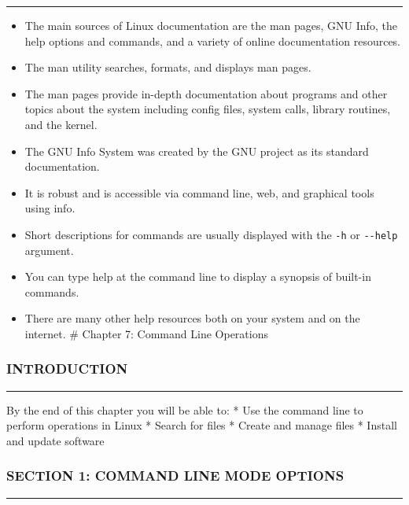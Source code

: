 \begin{center}\rule{3in}{0.4pt}\end{center}

\begin{itemize}
\itemsep1pt\parskip0pt
\item
  The main sources of Linux documentation are the man pages, GNU Info,
  the help options and commands, and a variety of online documentation
  resources.
\item
  The man utility searches, formats, and displays man pages.
\item
  The man pages provide in-depth documentation about programs and other
  topics about the system including config files, system calls, library
  routines, and the kernel.
\item
  The GNU Info System was created by the GNU project as its standard
  documentation.
\item
  It is robust and is accessible via command line, web, and graphical
  tools using info.
\item
  Short descriptions for commands are usually displayed with the
  \texttt{-h} or \texttt{-\/-help} argument.
\item
  You can type help at the command line to display a synopsis of
  built-in commands.
\item
  There are many other help resources both on your system and on the
  internet. \# Chapter 7: Command Line Operations
\end{itemize}

\subsubsection{INTRODUCTION}\label{introduction-6}

\begin{center}\rule{3in}{0.4pt}\end{center}

By the end of this chapter you will be able to: * Use the command line
to perform operations in Linux * Search for files * Create and manage
files * Install and update software

\subsubsection{SECTION 1: COMMAND LINE MODE
OPTIONS}\label{section-1-command-line-mode-options}

\begin{center}\rule{3in}{0.4pt}\end{center}

